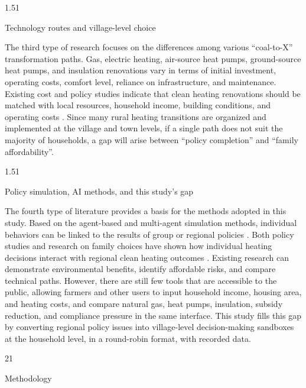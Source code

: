 \documentclass[stu,12pt,floatsintext,donotrepeattitle]{apa7}
\makeatletter
\newcommand{\Sanhao}{\fontsize{16pt}{20pt}\selectfont}
\newcommand{\Sihao}{\fontsize{14pt}{18pt}\selectfont}
\renewcommand{\section}{\@startsection{section}{1}{\z@}%
  {2\baselineskip}{1\baselineskip}%
  {\normalfont\Sanhao\bfseries\raggedright}}
\renewcommand{\subsection}{\@startsection{subsection}{2}{\z@}%
  {1.5\baselineskip}{1\baselineskip}%
  {\normalfont\Sihao\bfseries\raggedright}}
\makeatother
\begin{document}
\subsection{Technology routes and village-level choice}

The third type of research focuses on the differences among various ``coal-to-X'' transformation paths. Gas, electric heating, air-source heat pumps, ground-source heat pumps, and insulation renovations vary in terms of initial investment, operating costs, comfort level, reliance on infrastructure, and maintenance. Existing cost and policy studies indicate that clean heating renovations should be matched with local resources, household income, building conditions, and operating costs \cite{liu2020costs,zhao2024sustainable,zhai2023review,qin2026heating}. Since many rural heating transitions are organized and implemented at the village and town levels, if a single path does not suit the majority of households, a gap will arise between ``policy completion'' and ``family affordability''.

\subsection{Policy simulation, AI methods, and this study's gap}

The fourth type of literature provides a basis for the methods adopted in this study. Based on the agent-based and multi-agent simulation methods, individual behaviors can be linked to the results of group or regional policies \cite{wang2023abm,ma2024agi}. Both policy studies and research on family choices have shown how individual heating decisions interact with regional clean heating outcomes \cite{hu2021decoalizing,zhang2024uneven}. Existing research can demonstrate environmental benefits, identify affordable risks, and compare technical paths. However, there are still few tools that are accessible to the public, allowing farmers and other users to input household income, housing area, and heating costs, and compare natural gas, heat pumps, insulation, subsidy reduction, and compliance pressure in the same interface. This study fills this gap by converting regional policy issues into village-level decision-making sandboxes at the household level, in a round-robin format, with recorded data.

\section{Methodology}
\end{document}

